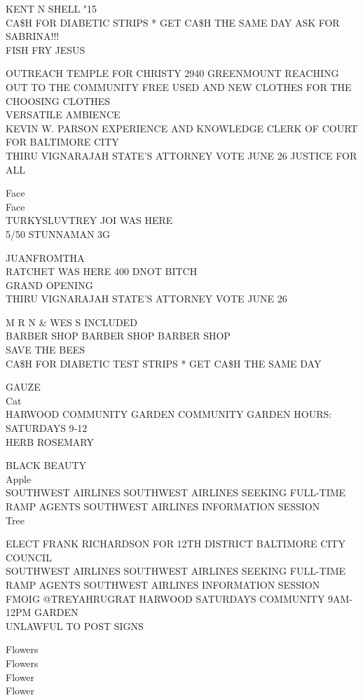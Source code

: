 \documentclass[10pt,letterpaper]{article}
\begin{document}
KENT N SHELL "15\\
CA\$H FOR DIABETIC STRIPS * GET CA\$H THE SAME DAY ASK FOR SABRINA!!!\\
FISH FRY JESUS

OUTREACH TEMPLE FOR CHRISTY 2940 GREENMOUNT REACHING OUT TO THE COMMUNITY FREE USED AND NEW CLOTHES FOR THE CHOOSING CLOTHES\\
VERSATILE AMBIENCE\\
KEVIN W. PARSON EXPERIENCE AND KNOWLEDGE CLERK OF COURT FOR BALTIMORE CITY\\
THIRU VIGNARAJAH STATE'S ATTORNEY VOTE JUNE 26 JUSTICE FOR ALL

Face\\
Face\\
TURKYSLUVTREY JOI WAS HERE\\
5/50 STUNNAMAN 3G

JUANFROMTHA\\
RATCHET WAS HERE 400 DNOT BITCH\\
GRAND OPENING\\
THIRU VIGNARAJAH STATE'S ATTORNEY VOTE JUNE 26

M R N \& WES S INCLUDED\\
BARBER SHOP BARBER SHOP BARBER SHOP\\
SAVE THE BEES\\
CA\$H FOR DIABETIC TEST STRIPS * GET CA\$H THE SAME DAY

GAUZE\\
Cat\\
HARWOOD COMMUNITY GARDEN COMMUNITY GARDEN HOURS: SATURDAYS 9{-}12\\
HERB ROSEMARY

BLACK BEAUTY\\
Apple\\
SOUTHWEST AIRLINES SOUTHWEST AIRLINES SEEKING FULL{-}TIME RAMP AGENTS SOUTHWEST AIRLINES INFORMATION SESSION\\
Tree

ELECT FRANK RICHARDSON FOR 12TH DISTRICT BALTIMORE CITY COUNCIL\\
SOUTHWEST AIRLINES SOUTHWEST AIRLINES SEEKING FULL{-}TIME RAMP AGENTS SOUTHWEST AIRLINES INFORMATION SESSION\\
FMOIG @TREYAHRUGRAT HARWOOD SATURDAYS COMMUNITY 9AM{-}12PM GARDEN\\
UNLAWFUL TO POST SIGNS

Flowers\\
Flowers\\
Flower\\
Flower
\end{document}
